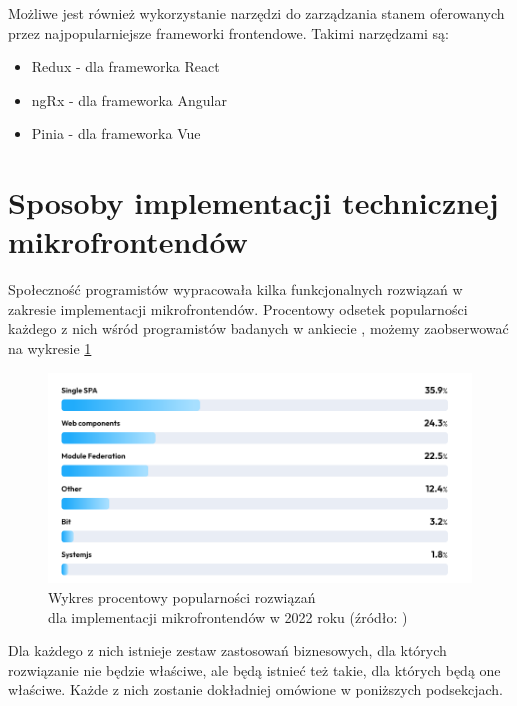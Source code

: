 \documentclass{SGGW-thesis}
\begin{document}
Możliwe jest również wykorzystanie narzędzi do zarządzania stanem oferowanych przez najpopularniejsze frameworki frontendowe. Takimi narzędzami są:

\begin{itemize}
  \item Redux - dla frameworka React
  \item ngRx - dla frameworka Angular
  \item Pinia - dla frameworka Vue
\end{itemize}

\section{Sposoby implementacji technicznej mikrofrontendów}
Społeczność programistów wypracowała kilka funkcjonalnych rozwiązań w zakresie implementacji mikrofrontendów. Procentowy odsetek popularności każdego z nich wśród programistów badanych w ankiecie \cite{tsh_2022}, możemy zaobserwować na wykresie \cref{fig:tsh_frontend_implementations}

\begin{figure}[h]
	\centering
	\captionsetup{justification=centering}
	\includegraphics[width=\textwidth]{frontend_implementations_by_percent.png}
	\caption[Wykres procentowy popularności rozwiązań dla implementacji mikrofrontendów w 2022 roku]{Wykres procentowy popularności rozwiązań \\ dla implementacji mikrofrontendów w 2022 roku (źródło: \cite{tsh_2022})}
	\label{fig:tsh_frontend_implementations}
\end{figure}

Dla każdego z nich istnieje zestaw zastosowań biznesowych, dla których rozwiązanie nie będzie właściwe, ale będą istnieć też takie, dla których będą one właściwe. Każde z nich zostanie dokładniej omówione w poniższych podsekcjach.
\end{document}
